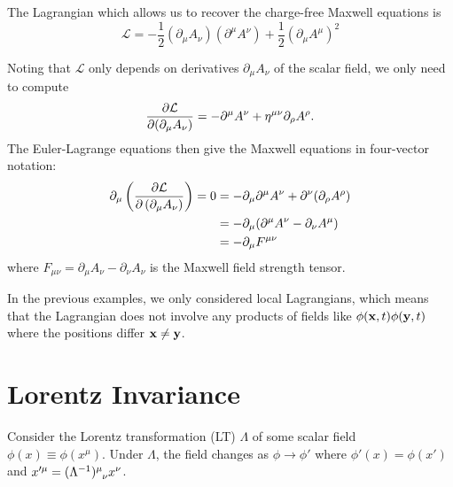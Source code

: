 

\begin{example}

The Lagrangian which allows us to recover the charge-free Maxwell equations is
\begin{equation}
  \mathcal{L} = -\frac{1}{2} (\partial_\mu A_\nu) (\partial^\mu A^\nu) + \frac{1}{2}(\partial_\mu A^\mu)^2
\end{equation}

Noting that $\mathcal{L}$ only depends on derivatives $\partial_\mu A_\nu$ of the scalar field, we only need to compute
\begin{equation}
  \pdv{\mathcal{L}}{(\partial_\mu A_\nu)} = -\partial^\mu A^\nu + \eta\indices{^\mu^\nu}\partial_\rho A^\rho.
\end{equation}
The Euler-Lagrange equations then give the Maxwell equations in four-vector notation:
\begin{align}
  \partial_\mu \left( \pdv{\mathcal{L}}{\left( \partial_\mu A_\nu \right)} \right) = 0 &= -\partial_\mu \partial^\mu A^\nu + \partial^\nu (\partial_\rho A^\rho) \\
  &= -\partial_\mu (\partial^\mu A^\nu - \partial_\nu A^\mu) \\
  &= -\partial_\mu F^{\mu \nu}
\end{align}
where $F_{\mu \nu} = \partial_\mu A_\nu - \partial_\nu A_\nu$ is the Maxwell field strength tensor.
\end{example}
In the previous examples, we only considered local Lagrangians, which means that the Lagrangian does not involve any products of fields like $\phi(\vb{x}, t) \phi(\vb{y}, t)$ where the positions differ $\vb{x} \neq \vb{y}$.

\section{Lorentz Invariance}%
\label{sec:lorentz_invariance}

Consider the Lorentz transformation (LT) $\Lambda$ of some scalar field $\phi(x) \equiv \phi(x^\mu)$.
Under $\Lambda$, the field changes as $\phi \to \phi'$ where $\phi'(x) = \phi(x')$ and $x'^\mu = (\Lambda^{-1})\indices{^\mu_\nu} x^\nu$.

